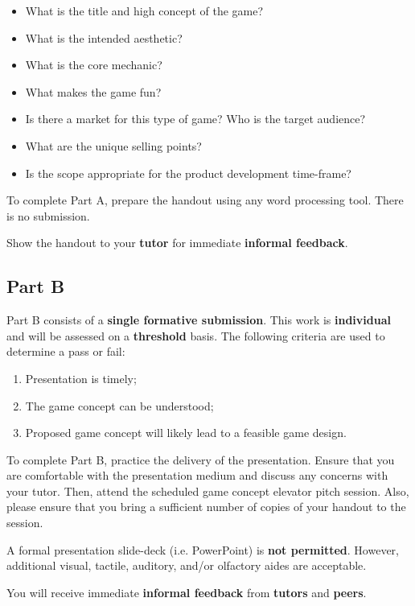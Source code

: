 \documentclass{../fal_assignment}
\begin{document}
\begin{itemize}
	\item What is the title and high concept of the game?
	\item What is the intended aesthetic?
	\item What is the core mechanic? 
	\item What makes the game fun?
	\item Is there a market for this type of game? Who is the target audience?
	\item What are the unique selling points?
	\item Is the scope appropriate for the product development time-frame?
\end{itemize}

To complete Part A, prepare the handout using any word processing tool. There is no submission.

Show the handout to your \textbf{tutor} for immediate \textbf{informal feedback}.

\subsection*{Part B}

Part B consists of a \textbf{single formative submission}. This work is \textbf{individual} and will be assessed on a \textbf{threshold} basis. The following criteria are used to determine a pass or fail:

\begin{enumerate}[label=(\alph*)]
	\item Presentation is timely;
	\item The game concept can be understood;
	\item Proposed game concept will likely lead to a feasible game design.
\end{enumerate}

To complete Part B, practice the delivery of the presentation. Ensure that you are comfortable with the presentation medium and discuss any concerns with your tutor. Then, attend the scheduled game concept elevator pitch session. Also, please ensure that you bring a sufficient number of copies of your handout to the session.

A formal presentation slide-deck (i.e. PowerPoint) is \textbf{not permitted}. However, additional visual, tactile, auditory, and/or olfactory aides are acceptable.

You will receive immediate \textbf{informal feedback} from \textbf{tutors} and \textbf{peers}.
\end{document}
